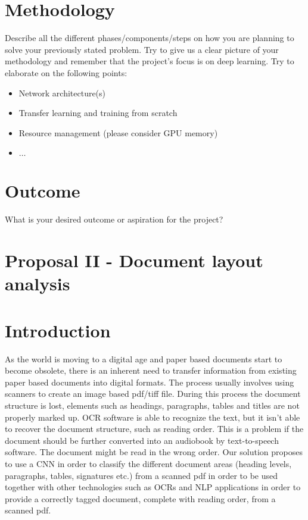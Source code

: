 \documentclass[10pt,twocolumn,letterpaper]{article}
\begin{document}
\section{Methodology}
    Describe all the different phases/components/steps on how you are planning to solve your previously stated problem. Try to give us a clear picture of your methodology and remember that the project's focus is on deep learning. Try to elaborate on the following points:
    \begin{itemize}
        \item Network architecture(s)
        \item Transfer learning and training from scratch
        \item Resource management (please consider GPU memory)
        \item[] $\dots$
    \end{itemize}

\section{Outcome}
    What is your desired outcome or aspiration for the project?

%
%
\section*{Proposal II - Document layout analysis}
\setcounter{section}{0}

\section{Introduction}
As the world is moving to a digital age and paper based documents start to become obsolete, there is an inherent need to transfer information from existing paper based documents into digital formats. The process usually involves using scanners to create an image based pdf/tiff file. During this process the document structure is lost, elements such as headings, paragraphs, tables and titles are not properly marked up. OCR software is able to recognize the text, but it isn't able to recover the document structure, such as reading order. This is a problem if the document should be further converted into an audiobook by text-to-speech software. The document might be read in the wrong order. Our solution proposes to use a CNN in order to classify the different document areas (heading levels, paragraphs, tables, signatures etc.) from a scanned pdf in order to be used together with other technologies such as OCRs and NLP applications in order to provide a correctly tagged document, complete with reading order, from a scanned pdf.
\end{document}
